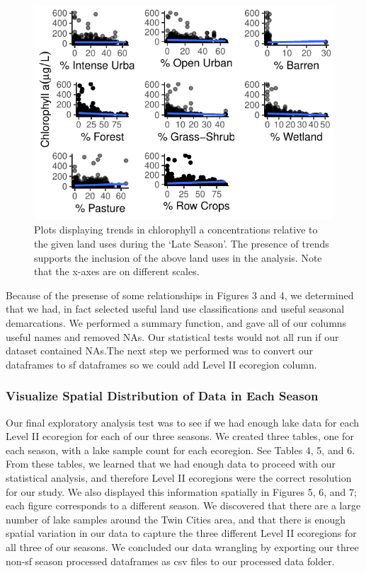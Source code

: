 \documentclass[12pt,]{article}
\begin{document}
\begin{figure}
\centering
\includegraphics{Bollt_Greif_Raby_Roth_Project_Final_files/figure-latex/unnamed-chunk-8-1.pdf}
\caption{Plots displaying trends in chlorophyll a concentrations
relative to the given land uses during the `Late Season'. The presence
of trends supports the inclusion of the above land uses in the analysis.
Note that the x-axes are on different scales.}
\end{figure}

Because of the presense of some relationships in Figures 3 and 4, we
determined that we had, in fact selected useful land use classifications
and useful seasonal demarcations. We performed a summary function, and
gave all of our columns useful names and removed NAs. Our statistical
tests would not all run if our dataset contained NAs.The next step we
performed was to convert our dataframes to sf dataframes so we could add
Level II ecoregion column.

\hypertarget{visualize-spatial-distribution-of-data-in-each-season}{%
\subsubsection{Visualize Spatial Distribution of Data in Each
Season}\label{visualize-spatial-distribution-of-data-in-each-season}}

Our final exploratory analysis test was to see if we had enough lake
data for each Level II ecoregion for each of our three seasons. We
created three tables, one for each season, with a lake sample count for
each ecoregion. See Tables 4, 5, and 6. From these tables, we learned
that we had enough data to proceed with our statistical analysis, and
therefore Level II ecoregions were the correct resolution for our study.
We also displayed this information spatially in Figures 5, 6, and 7;
each figure corresponds to a different season. We discovered that there
are a large number of lake samples around the Twin Cities area, and that
there is enough spatial variation in our data to capture the three
different Level II ecoregions for all three of our seasons. We concluded
our data wrangling by exporting our three non-sf season processed
dataframes as csv files to our processed data folder.
\end{document}
